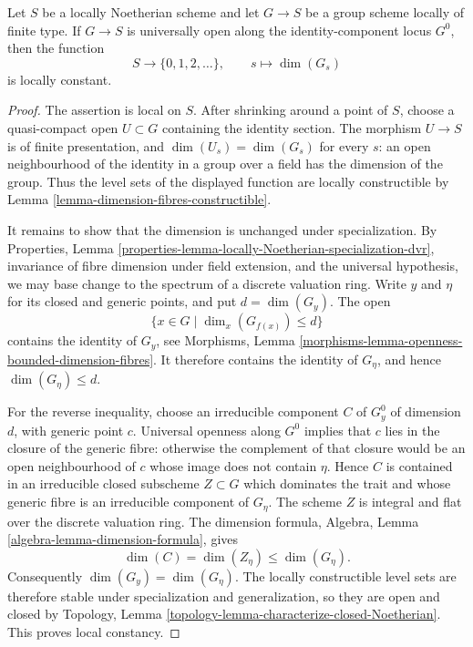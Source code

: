 \begin{lemma}
\label{lemma-identity-component-open-fibre-dimension}
Let $S$ be a locally Noetherian scheme and let $G \to S$ be a group scheme
locally of finite type. If $G \to S$ is universally open along the
identity-component locus $G^0$, then the function
$$
S \longrightarrow \{0,1,2,\ldots\}, \qquad
s \longmapsto \dim(G_s)
$$
is locally constant.
\end{lemma}

\begin{proof}
The assertion is local on $S$. After shrinking around a point of $S$, choose
a quasi-compact open $U \subset G$ containing the identity section. The
morphism $U \to S$ is of finite presentation, and
$\dim(U_s)=\dim(G_s)$ for every $s$: an open neighbourhood of the identity in
a group over a field has the dimension of the group. Thus the level sets of
the displayed function are locally constructible by
Lemma \ref{lemma-dimension-fibres-constructible}.

It remains to show that the dimension is unchanged under specialization.
By Properties, Lemma
\ref{properties-lemma-locally-Noetherian-specialization-dvr}, invariance of
fibre dimension under field extension, and the universal hypothesis, we may
base change to the spectrum of a discrete valuation ring. Write $y$ and
$\eta$ for its closed and generic points, and put $d=\dim(G_y)$. The open
$$
\{x \in G \mid \dim_x(G_{f(x)}) \leq d\}
$$
contains the identity of $G_y$, see Morphisms, Lemma
\ref{morphisms-lemma-openness-bounded-dimension-fibres}. It therefore contains
the identity of $G_\eta$, and hence $\dim(G_\eta) \leq d$.

For the reverse inequality, choose an irreducible component $C$ of $G^0_y$
of dimension $d$, with generic point $c$. Universal openness along $G^0$
implies that $c$ lies in the closure of the generic fibre: otherwise the
complement of that closure would be an open neighbourhood of $c$ whose image
does not contain $\eta$. Hence $C$ is contained in an irreducible closed
subscheme $Z \subset G$ which dominates the trait and whose generic fibre is
an irreducible component of $G_\eta$. The scheme $Z$ is integral and flat
over the discrete valuation ring. The dimension formula, Algebra, Lemma
\ref{algebra-lemma-dimension-formula}, gives
$$
\dim(C)=\dim(Z_\eta) \leq \dim(G_\eta).
$$
Consequently $\dim(G_y)=\dim(G_\eta)$. The locally constructible level sets
are therefore stable under specialization and generalization, so they are
open and closed by Topology, Lemma
\ref{topology-lemma-characterize-closed-Noetherian}. This proves local
constancy.
\end{proof}

